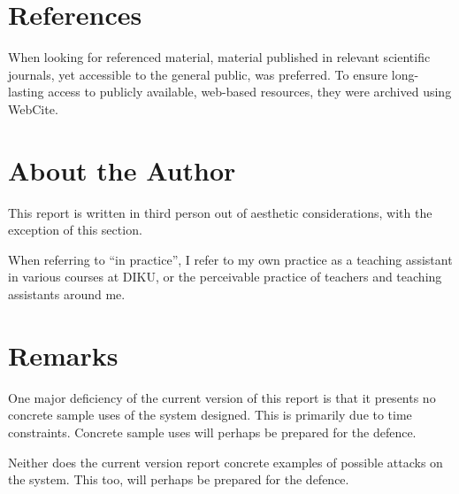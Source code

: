 \section{References}

When looking for referenced material, material published in relevant scientific
journals, yet accessible to the general public, was preferred. To ensure
long-lasting access to publicly available, web-based resources, they were
archived using WebCite\textsuperscript{\textregistered}.

\section{About the Author}

This report is written in third person out of aesthetic considerations, with
the exception of this section.

When referring to ``in practice'', I refer to my own practice as a teaching
assistant in various courses at DIKU, or the perceivable practice of teachers
and teaching assistants around me.

\section{Remarks}

One major deficiency of the current version of this report is that it presents
no concrete sample uses of the system designed. This is primarily due to time
constraints. Concrete sample uses will perhaps be prepared for the defence.

Neither does the current version report concrete examples of possible attacks
on the system. This too, will perhaps be prepared for the defence.
